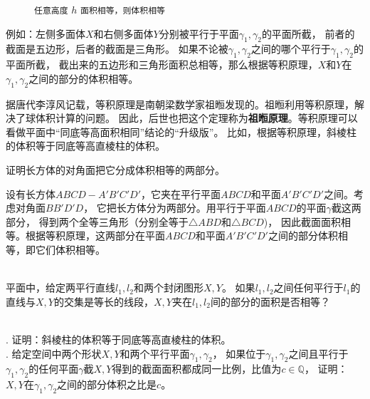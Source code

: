 \documentclass[12pt,UTF8]{ctexbook}
\begin{document}
\begin{figure}[h]
    \captionsetup{justification=centering}
    \caption*{\texttt{任意高度} $h$ \texttt{面积相等，则体积相等}}
\end{figure}


例如：左侧多面体$X$和右侧多面体$Y$分别被平行于平面$\gamma_1,\gamma_2$的平面所截，
前者的截面是五边形，后者的截面是三角形。
如果不论被$\gamma_1,\gamma_2$之间的哪个平行于$\gamma_1,\gamma_2$的平面所截，
截出来的五边形和三角形面积总相等，那么根据等积原理，$X$和$Y$在$\gamma_1,\gamma_2$之间的部分的体积相等。

据唐代李淳风记载，等积原理是南朝梁数学家祖暅发现的。祖暅利用等积原理，解决了球体积计算的问题。
因此，后世也把这个定理称为\textbf{祖暅原理}。等积原理可以看做平面中“同底等高面积相同”结论的“升级版”。
比如，根据等积原理，斜棱柱的体积等于同底等高直棱柱的体积。
\begin{et}
    证明长方体的对角面把它分成体积相等的两部分。
\end{et}
\begin{so}
    设有长方体$ABCD-A'B'C'D'$，它夹在平行平面$ABCD$和平面$A'B'C'D'$之间。考虑对角面$BB'D'D$，
    它把长方体分为两部分。用平行于平面$ABCD$的平面$\gamma$截这两部分，
    得到两个全等三角形（分别全等于$\triangle ABD$和$\triangle BCD$)，
    因此截面面积相等。根据等积原理，这两部分在平面$ABCD$和平面$A'B'C'D'$之间的部分体积相等，即它们体积相等。
\end{so}
\begin{sk}
    \mbox{}\\
    平面中，给定两平行直线$l_1,l_2$和两个封闭图形$X,Y$。
    如果$l_1,l_2$之间任何平行于$l_1$的直线与$X,Y$的交集是等长的线段，$X,Y$夹在$l_1,l_2$间的部分的面积是否相等？
\end{sk}
\begin{xt}
    \mbox{}\\
    . 证明：斜棱柱的体积等于同底等高直棱柱的体积。\\
    . 给定空间中两个形状$X,Y$和两个平行平面$\gamma_1,\gamma_2$，
    如果位于$\gamma_1,\gamma_2$之间且平行于$\gamma_1,\gamma_2$的任何平面$\gamma$截$X,Y$得到的截面面积都成同一比例，比值为$c\in\mathbb{Q}$，
    证明：$X,Y$在$\gamma_1,\gamma_2$之间的部分体积之比是$c$。
\end{xt}
\end{document}
